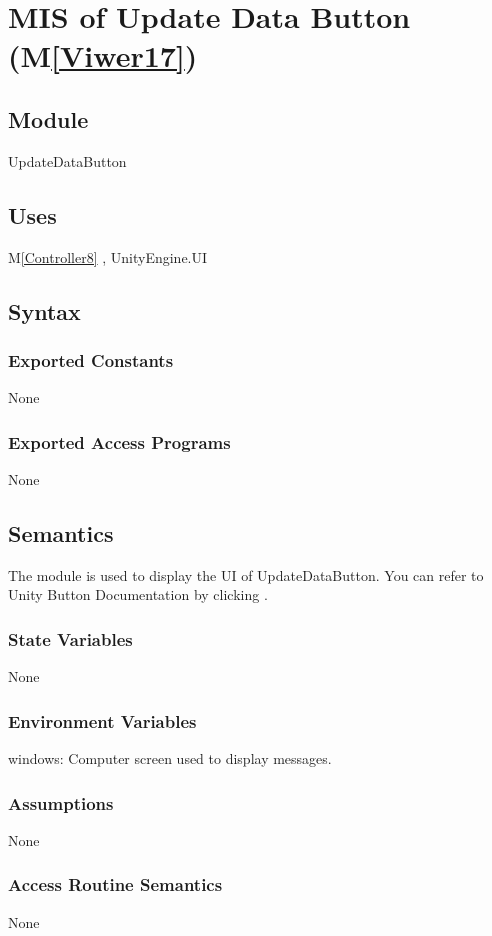 \documentclass[12pt, titlepage]{article}
\newcommand{\mref}[1]{M\ref{#1}}
\begin{document}

\newpage

\section{MIS of Update Data Button (\mref{Viwer17})}

\subsection{Module}
UpdateDataButton

\subsection{Uses}
\mref{Controller8} , UnityEngine.UI 

\subsection{Syntax}
\subsubsection{Exported Constants}
None
\subsubsection{Exported Access Programs}
None

\subsection{Semantics}
The module is used to display the UI of UpdateDataButton. You can refer to Unity Button Documentation by clicking \bref.
\subsubsection{State Variables}
None
\subsubsection{Environment Variables}
windows: Computer screen used to display messages.
\subsubsection{Assumptions}
None
\subsubsection{Access Routine Semantics}
None
\end{document}
